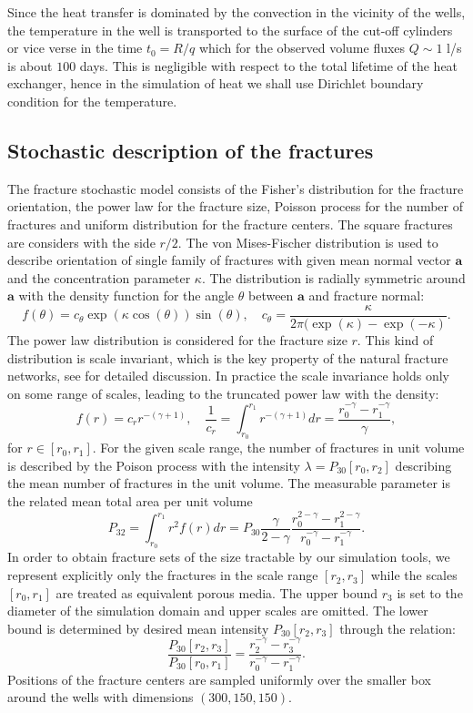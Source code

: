 \documentclass{article}
\newcommand{\eq}[1]{\begin{equation}#1\end{equation}}
\newcommand{\vc}[1]{\boldsymbol{#1}}
\begin{document}
Since the heat transfer is dominated by the convection in the vicinity of the wells, the temperature in the well is transported to the surface of the cut-off cylinders or vice verse in the time $t_0 = R/q$ which for the observed volume fluxes $Q\sim 1$ l/s is about $100$ days. This is negligible with respect to the total lifetime of the heat exchanger, hence in the simulation of heat we shall use Dirichlet boundary condition for the temperature.

\subsection{Stochastic description of the fractures}
\label{sec:stochastic_dfn}
The fracture stochastic model consists of the Fisher's distribution for the fracture orientation, the power law for the fracture size, Poisson process for the number of fractures and uniform distribution for the fracture centers. The square fractures are considers with the side $r/2$. 
The von Mises-Fischer distribution \cite{Fisher1993} is used to describe orientation of single family of fractures with given mean normal vector $\vc a$ and the concentration parameter $\kappa$. The distribution is radially symmetric around $\vc a$ with the density function for the angle $\theta$ between $\vc a$ and fracture normal:
\[
 f(\theta) = c_\theta \exp(\kappa \cos(\theta)) \sin(\theta),
 \quad
 c_\theta = \frac{\kappa}{2\pi(\exp(\kappa) - \exp(-\kappa)}.
\] 
The power law distribution is considered for the fracture size $r$.
This kind of distribution is scale invariant, which is the key property of the natural fracture networks, see \cite{Bonnet2001} for detailed discussion. In practice the scale invariance holds only on some range of scales, leading to the truncated power law with the density:
\begin{equation}
    \label{eq:pow_law}
    f(r) = c_r r^{-(\gamma+1)},\quad 
    \frac{1}{c_r}=\int_{r_0}^{r_1} r^{-(\gamma+1)} dr = 
    \frac{r_0^{-\gamma} - r_1^{-\gamma}}{\gamma},
\end{equation}
for $r \in [r_0, r_1]$. 
For the given scale range, the number of fractures in unit volume is described by the Poison process with the intensity $\lambda=P_{30}[r_0, r_2]$ describing the mean number of fractures in the unit volume. The measurable parameter is the related mean total area per unit volume 
\[
P_{32} =
   \int_{r_0}^{r_1} r^2 f(r) dr =
    P_{30} \frac{\gamma}{2-\gamma}    \frac{r_0^{2-\gamma} - r_1^{2-\gamma}}
    {r_0^{-\gamma} - r_1^{-\gamma}}.
\]
In order to obtain fracture sets of the size tractable by our simulation tools, we represent explicitly only the fractures in the scale range $[r_2, r_3]$ while the scales $[r_0, r_1]$ are treated as equivalent porous media. The upper bound $r_3$ is set to the diameter of the simulation domain and upper scales are omitted. The lower bound is determined by desired mean intensity $P_{30}[r_2, r_3]$ through the relation:
\eq{
    \label{eq:pl_rescale}
    \frac{P_{30}[r_2, r_3]}{P_{30}[r_0, r_1]} 
    =
    \frac{r_2^{-\gamma} - r_3^{-\gamma}}
    {r_0^{-\gamma} - r_1^{-\gamma}}.
}
Positions of the fracture centers are sampled uniformly over the smaller box around the wells with dimensions $(300, 150, 150)$. 
\end{document}
